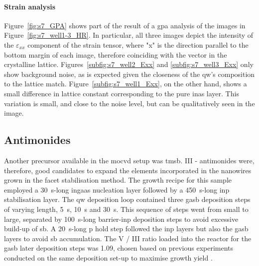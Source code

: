 \paragraph{Strain analysis} Figure~\ref{fig:s7_GPA} shows part of the result of a \acf{gpa} analysis of the images in Figure~\ref{fig:s7_well1-3_HR}. In particular, all three images depict the intensity of the $\varepsilon_{xx}$ component of the strain tensor, where "x" is the direction parallel to the bottom margin of each image, therefore coinciding with the  vector in the crystalline lattice. Figures~\ref{subfig:s7_well2_Exx} and \ref{subfig:s7_well3_Exx} only show background noise, as is expected given the closeness of the \acl{qw}'s composition to the lattice match. Figure~\ref{subfig:s7_well1_Exx}, on the other hand, shows a small difference in lattice constant corresponding to the pure \acs{inas} layer. This variation is small, and close to the noise level, but can be qualitatively seen in the image.

\subsection{Antimonides}

Another precursor available in the \acs{mocvd} setup was \acf{tmsb}. III - antimonides were, therefore, good candidates to expand the elements incorporated in the nanowires grown in the  facet stabilisation method. The growth recipe for this sample employed a \qty{30}{\second}-long \acs{ingaas} nucleation layer followed by a \qty{450}{\second}-long \acs{inp} stabilisation layer. The \acl{qw} deposition loop contained three \acf{gasb} deposition steps of varying length, \qty{5}{\second}, \qty{10}{\second} and \qty{30}{\second}. This sequence of steps went from small to large, separated by \qty{100}{\second}-long barrier-\acs{inp} deposition steps to avoid excessive build-up of \acl{sb}. A \qty{20}{\second}-long \acl{p} hold step followed the \acs{inp} layers but also the \acs{gasb} layers to avoid \acl{sb} accumulation. The V / III ratio loaded into the reactor for the \acs{gasb} later deposition steps was \num{1.09}, chosen based on previous experiments conducted on the same deposition set-up to maximise growth yield \cite{Borg2017}.

